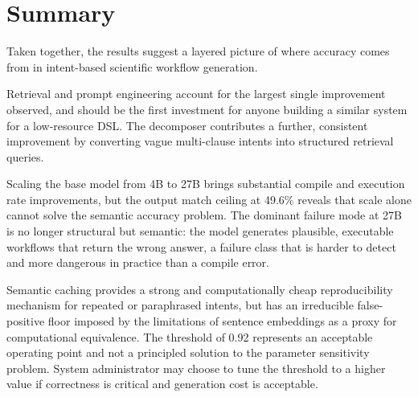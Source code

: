 \section{Summary}

Taken together, the results suggest a layered picture of where accuracy comes
from in intent-based scientific workflow generation.

Retrieval and prompt engineering account for the largest single improvement
observed, and should be the first investment for anyone building a similar
system for a low-resource DSL. The decomposer contributes a further, consistent
improvement by converting vague multi-clause intents into structured retrieval
queries.

Scaling the base model from 4B to 27B brings substantial compile and execution
rate improvements, but the output match ceiling at 49.6\% reveals that scale
alone cannot solve the semantic accuracy problem. The dominant failure mode at
27B is no longer structural but semantic: the model generates plausible,
executable workflows that return the wrong answer, a failure class that is
harder to detect and more dangerous in practice than a compile error.

Semantic caching provides a strong and computationally cheap reproducibility
mechanism for repeated or paraphrased intents, but has an irreducible
false-positive floor imposed by the limitations of sentence embeddings as a
proxy for computational equivalence. The threshold of 0.92 represents an
acceptable operating point and not a principled solution to the parameter
sensitivity problem. System administrator may choose to tune the threshold to
a higher value if correctness is critical and generation cost is acceptable.
